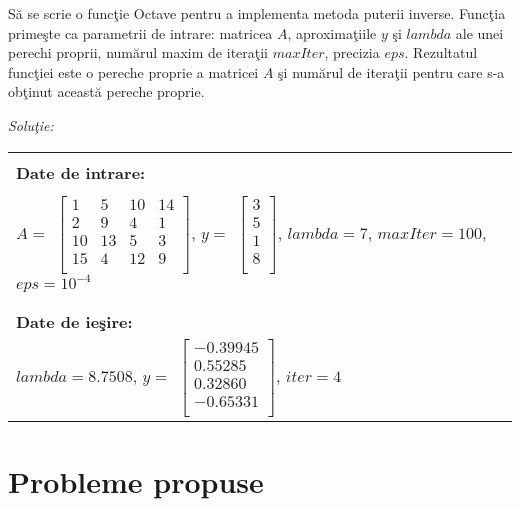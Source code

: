 \documentclass{exam}
\newcommand{\octavescript}[2]{
	
}
\begin{document}
Să se scrie o funcţie Octave pentru a implementa metoda puterii inverse. Funcţia primeşte ca parametrii de intrare: matricea $A$, aproximaţiile $y$ şi $lambda$ ale unei perechi proprii, numărul maxim de iteraţii $maxIter$, precizia $eps$. Rezultatul funcţiei este o pereche proprie a matricei $A$ şi numărul de iteraţii pentru care s-a obţinut această pereche proprie.

\textit{Soluţie:}
\octavescript{./src/PutereInv.m}{Metoda puterii inverse}

\begin{center}
	\begin{tabular}{| l | l |}
		\hline
		\\
		\textbf{Date de intrare:} \\\\
		$A = $
		$\begin{bmatrix}
				 1  & 5  & 10 & 14 \\
				 2  & 9  & 4  & 1  \\
				 10 & 13 & 5  & 3  \\
				 15 & 4  & 12 & 9  \\
			 \end{bmatrix}
		$,
		$ y = $
		$\begin{bmatrix}
				 3 \\
				 5 \\
				 1 \\
				 8 \\
			 \end{bmatrix}
		$,
		$ lambda = 7$, $ maxIter = 100$, $eps = 10^{-4}$
		\\ \\
		\hline
		\\
		\textbf{Date de ieşire:}  \\
		$lambda = 8.7508$,
		$ y = $
		$\begin{bmatrix}
				 -0.39945 \\
				 0.55285  \\
				 0.32860  \\
				 -0.65331 \\
			 \end{bmatrix}
		$,
		$iter = 4$                \\
		\hline
	\end{tabular}
\end{center}


\section{Probleme propuse}
\end{document}
